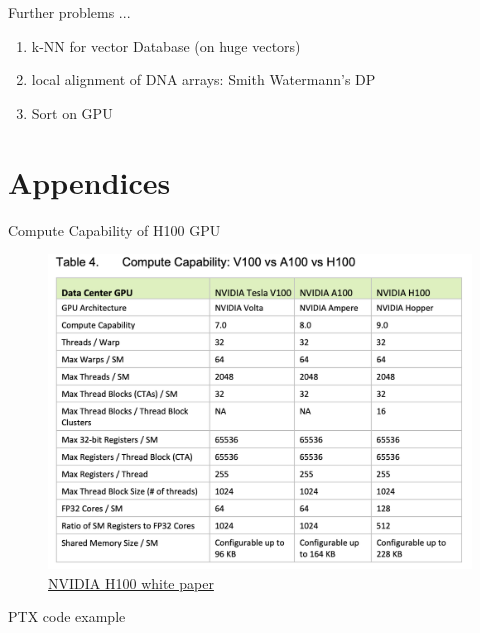 \documentclass[dvipdfmx, 11pt, aspectratio=169]{beamer}   %
\begin{document}
\begin{frame}{Further problems ...}
  \begin{enumerate}
    \item k-NN for vector Database (on huge vectors)
    \item local alignment of DNA arrays: Smith Watermann's DP
    \item Sort on GPU
  \end{enumerate}
\end{frame}
\section{Appendices}
\begin{frame}{Compute Capability of H100 GPU}
  \begin{figure}
    \includegraphics[scale=0.3]{img/computeCapability.png}
    \caption{\href{https://www.advancedclustering.com/wp-content/uploads/2022/03/gtc22-whitepaper-hopper.pdf}{NVIDIA H100 white paper}}
  \end{figure}
\end{frame}
\begin{frame}{PTX code example}
  
\end{frame}
\end{document}
